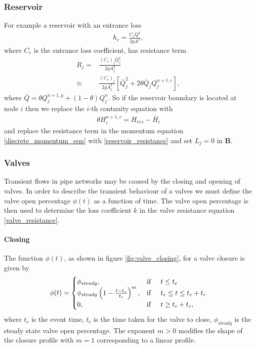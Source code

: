 \documentclass[12pt]{article}
\begin{document}
{\color{red}

\subsubsection{Reservoir}

For example a reservoir with an entrance loss 
\begin{align}
h_e = \frac{C_e Q^2}{2 g A^2},
\end{align}
where $C_e$ is the entrance loss coefficient, has resistance term
\begin{align}\label{reservoir_resistance}
R_j =& \frac{(C_e)_j Q_j^2}{2 g A_j^2} \\
\approx & \frac{(C_e)_j }{2 g A_j^2} \left[ \bar{Q}_j^2 + 2 \theta \bar{Q}_j Q_j^{n+1,c}  \right],
\end{align}
where $\bar{Q} = \theta Q_j^{n+1,g} + (1-\theta) Q_j^n$. So if the reservoir boundary is located at node $i$ then we replace the $i$-th contnuity equation with 
\begin{align}
\theta H_i^{n+1,c} = H_{res} - \bar{H}_i
\end{align}
and replace the resistance term in the momentum equation \eqref{discrete_momentum_eqn} with \eqref{reservoir_resistance} and set $L_j = 0$ in $\mathbf{B}$.

}

\subsubsection{Valves}

Transient flows in pipe networks may be caused by the closing and opening of valves. In order to describe the transient behaviour of a valves we must define the valve open percentage $\phi(t)$ as a function of time. The valve open percentage is then used to determine the loss coefficient $k$ in the valve resistance equation \eqref{valve_resistance}.

\paragraph{Closing}
 
 The function $\phi(t)$, as shown in figure \ref{fig:valve_closing}, for a valve closure is given by 
\begin{align}\label{valve_closure_function}
\phi(t) = 
\begin{cases} 
\phi_{steady}, &\text{if} \hspace{0.5cm} t \leq t_e \\
\phi_{steady} \left( 1 - \frac{t-t_e}{t_c} \right)^m, &\text{if} \hspace{0.5cm} t_e \leq t \leq t_e + t_c \\
0, &\text{if} \hspace{0.5cm} t \geq t_e + t_c, 
\end{cases}
\end{align} 
where $t_e$ is the event time, $t_c$ is the time taken for the valve to close, $\phi_{steady}$ is the steady state valve open percentage. The exponent $m > 0$ modifies the shape of the closure profile with $m=1$ corresponding to a linear profile. 
 
\end{document}
